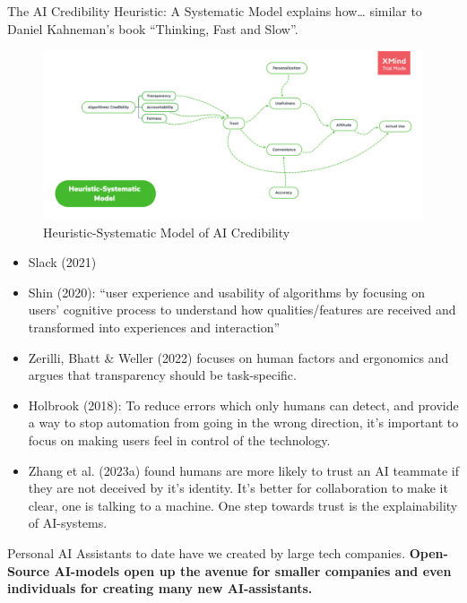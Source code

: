 \documentclass[
  letterpaper,
  DIV=11,
  numbers=noendperiod]{scrartcl}
\begin{document}
The AI Credibility Heuristic: A Systematic Model explains how\ldots{}
similar to Daniel Kahneman's book ``Thinking, Fast and Slow''.

\begin{figure}[H]

{\centering \includegraphics[width=1\textwidth,height=\textheight]{./images/ai-credibility.png}

}

\caption{Heuristic-Systematic Model of AI Credibility}

\end{figure}%

\begin{itemize}
\item
  Slack (2021)
\item
  Shin (2020): ``user experience and usability of algorithms by focusing
  on users' cognitive process to understand how qualities/features are
  received and transformed into experiences and interaction''
\item
  Zerilli, Bhatt \& Weller (2022) focuses on human factors and
  ergonomics and argues that transparency should be task-specific.
\item
  Holbrook (2018): To reduce errors which only humans can detect, and
  provide a way to stop automation from going in the wrong direction,
  it's important to focus on making users feel in control of the
  technology.
\item
  Zhang et al. (2023a) found humans are more likely to trust an AI
  teammate if they are not deceived by it's identity. It's better for
  collaboration to make it clear, one is talking to a machine. One step
  towards trust is the explainability of AI-systems.
\end{itemize}

Personal AI Assistants to date have we created by large tech companies.
\textbf{Open-Source AI-models open up the avenue for smaller companies
and even individuals for creating many new AI-assistants.}
\end{document}
